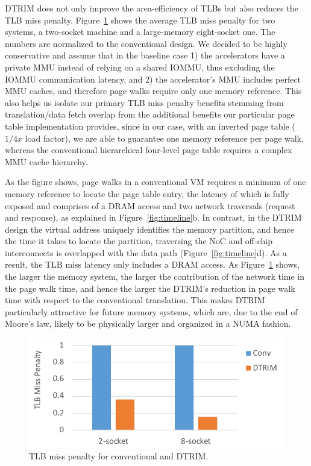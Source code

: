 DTRIM does not only improve the area-efficiency of TLBs but also reduces the TLB miss penalty. Figure~\ref{fig:penalty} shows the average TLB miss penalty for two systems, a two-socket machine and a large-memory eight-socket one. The numbers are normalized to the conventional design. We decided to be highly conservative and assume that in the baseline case 1) the accelerators have a private MMU instead of relying on a shared IOMMU, thus excluding the IOMMU communication latency, and 2) the accelerator's MMU includes perfect MMU caches, and therefore page walks require only one memory reference. This also helps us isolate our primary TLB miss penalty benefits stemming from translation/data fetch overlap from the additional benefits our particular page table implementation provides, since in our case, with an inverted page table ($1/4x$ load factor), we are able to guarantee one memory reference per page walk, whereas the conventional hierarchical four-level page table requires a complex MMU cache hierarchy.

As the figure shows, page walks in a conventional VM requires a minimum of one memory reference to locate the page table entry, the latency of which is fully exposed and comprises of a DRAM access and two network traversals (request and response), as explained in Figure~\ref{fig:timeline}b. In contrast, in the DTRIM design the virtual address uniquely identifies the memory partition, and hence the time it takes to locate the partition, traversing the NoC and off-chip interconnects is overlapped with the data path (Figure~\ref{fig:timeline}d). As a result, the TLB miss latency only includes a DRAM access. As Figure~\ref{fig:penalty} shows, the larger the memory system, the larger the contribution of the network time in the page walk time, and hence the larger the DTRIM's reduction in page walk time with respect to the conventional translation. This makes DTRIM particularly attractive for future memory systems, which are, due to the end of Moore's law, likely to be physically larger and organized in a NUMA fashion.

\begin{figure}[t]
	\centering
	\includegraphics[width=1.0\columnwidth]{graphs/penalty.pdf}
	\caption{TLB miss penalty for conventional and DTRIM.}
	\label{fig:penalty}
\end{figure}



